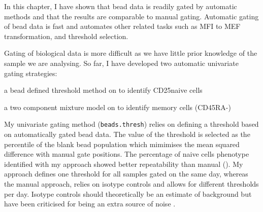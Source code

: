 %
In this chapter, I have shown that bead data is readily gated by automatic methods and that the results are comparable to manual gating.
Automatic gating of bead data is fast and automates other related tasks such as MFI to MEF transformation, and threshold selection.

Gating of biological data is more difficult as we have little prior knowledge of the sample we are analysing.
So far, I have developed two automatic univariate gating strategies:
\begin{itemise}
\item a bead defined threshold method on  to identify CD25\positive naive cells
\item a two component mixture model on  to identify memory cells (CD45RA-)
\end{itemise}

My  univariate gating method (\texttt{beads.thresh}) relies on defining a threshold based on automatically gated bead data.
The value of the threshold is selected as the percentile of the blank bead population which mimimises the mean squared difference with manual gate positions.
The percentage of naive \positive cells phenotype identified with my approach showed better repeatability than manual ().
My approach defines one threshold for all samples gated on the same day,
whereas the manual approach, relies on isotype controls and allows for different thresholds per day.
Isotype controls should theoretically be an estimate of background but have been criticised for being an extra source of noise \citep{OGorman:1999vd}.

